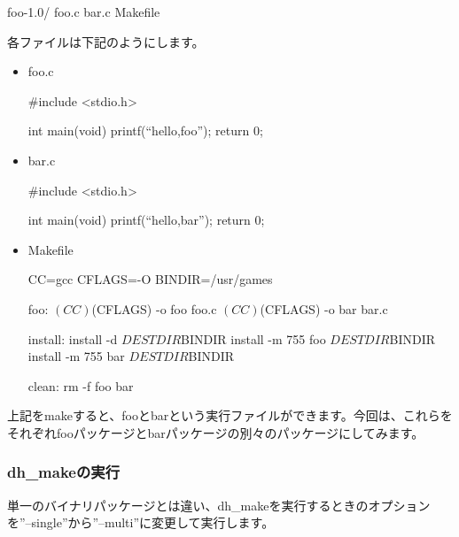 \documentclass[mingoth,a4paper]{jsarticle}
\begin{document}
\begin{commandline}
foo-1.0/
 foo.c
 bar.c
 Makefile
\end{commandline}
各ファイルは下記のようにします。
\begin{itemize}
 \item
      foo.c
      \begin{commandline}
#include <stdio.h>

int main(void)
{
  printf(``hello,foo\n'');
  return 0;
}
      \end{commandline}
 \item
      bar.c
      \begin{commandline}
#include <stdio.h>

int main(void)
{
  printf(``hello,bar\n'');
  return 0;
}
      \end{commandline}
 \item
      Makefile
      \begin{commandline}
CC=gcc
CFLAGS=-O
BINDIR=/usr/games

foo:
       $(CC) $(CFLAGS) -o foo foo.c
       $(CC) $(CFLAGS) -o bar bar.c

install:
       install -d ${DESTDIR}${BINDIR}
       install -m 755 foo ${DESTDIR}${BINDIR}
       install -m 755 bar ${DESTDIR}${BINDIR}

clean:
       rm -f foo bar
      \end{commandline}
\end{itemize}
上記をmakeすると、fooとbarという実行ファイルができます。今回は、これらを
それぞれfooパッケージとbarパッケージの別々のパッケージにしてみます。

\subsubsection{dh\_makeの実行}
単一のバイナリパッケージとは違い、dh\_makeを実行するときのオプション
を''--single''から''--multi''に変更して実行します。

\end{document}
